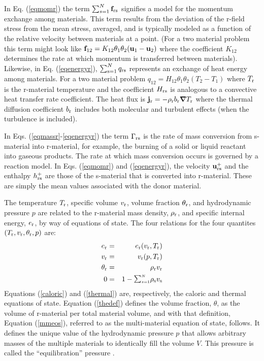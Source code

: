 In Eq. (\ref{eqmomr}) the term $\sum_{s=1}^{N}{\bf f}_{{\rm r}{\rm s}}$ signifies a model for the momentum exchange among materials.  This term results from the deviation of the r-field stress from the mean stress, averaged, and is typically modeled as a function of the relative velocity between materials at a point. (For a two material problem this term might look like ${\bf f}_{12} = K_{12}\theta_1\theta_2({\bf u}_1 - {\bf u}_2)$ where the coefficient $K_{12}$ determines the rate at which momentum is transferred between materials).  Likewise, in Eq. (\ref{eqenergyr}), $\sum_{{\rm s}=1}^{N} q_{{\rm r}{\rm s}}$ represents an exchange of heat energy among materials.  For a two material problem $q_{12} = H_{12}\theta_1\theta_2(T_2 - T_1)$ where $T_{\rm r}$ is the r-material temperature and the coefficient $H_{{\rm r}{\rm s}}$ is analogous to a convective heat transfer rate coefficient.  The heat flux is ${\bf j}_{\rm r} = -\rho_{\rm r} b_{\rm r} \mbox {\boldmath $\nabla \!\!$ \unboldmath} T_{\rm r}$ where the thermal diffusion coefficient $b_{\rm r}$ includes both molecular and turbulent effects (when the turbulence is included).

In Eqs. (\ref{eqmassr}-\ref{eqenergyr}) the term $\Gamma_{{\rm r}{\rm s}}$ is the rate of mass conversion from s-material into r-material, for example, the burning of a solid or liquid reactant into gaseous products.  The rate at which mass conversion occurs is governed by a reaction model.  In Eqs. (\ref{eqmomr}) and (\ref{eqenergyr}), the velocity ${\bf u}_{{\rm r}{\rm s}}^+$ and the enthalpy $h_{{\rm r}{\rm s}}^+$ are those of the s-material that is converted into r-material. These are simply the mean values associated with the donor material.

The temperature $T_{\rm r}$, specific volume $v_{\rm r}$, volume fraction $\theta_{\rm r}$, and hydrodynamic pressure $p$ are related to the r-material mass density, $\rho_{\rm r}$, and specific internal energy, $e_{\rm r}$, by way of equations of state.  The four relations for the four quantites $(T_{\rm r}, v_{\rm r}, \theta_{\rm r}, p)$ are:
%
\begin{eqnarray}
e_\rmr &=& e_\rmr(v_\rmr, T_\rmr) \label{caloric} \\
v_\rmr &=& v_\rmr(p, T_\rmr) \label{thermal} \\
\theta_\rmr &=& \rho_\rmr v_\rmr \label{thedef} \\
0 &=& 1 - \SUM\rho_\rms v_\rms
\label{mmeos}
\end{eqnarray}
%
Equations (\ref{caloric}) and (\ref{thermal}) are, respectively, the caloric and thermal equations of state.  Equation (\ref{thedef}) defines the volume fraction, $\theta$, as the volume of r-material per total material volume, and with that definition, Equation (\ref{mmeos}), referred to as the multi-material equation of state, follows.  It defines the unique value of the hydrodynamic pressure $p$ that allows arbitrary masses of the multiple materials to identically fill the volume $V$.  This pressure is called the ``equilibration'' pressure \cite{kashiwaICE94}.

